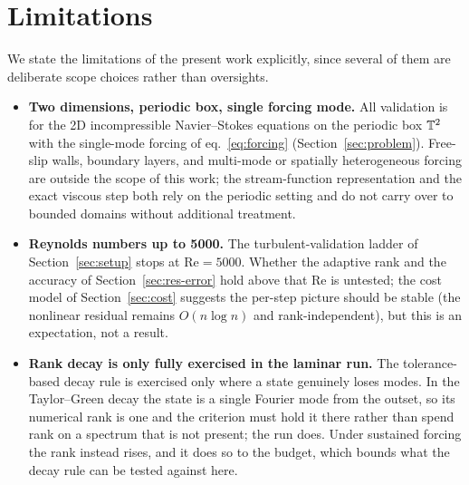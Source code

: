 
\section{Limitations}
\label{sec:limitations}

We state the limitations of the present work explicitly, since several of
them are deliberate scope choices rather than oversights.

\begin{itemize}
  \item \textbf{Two dimensions, periodic box, single forcing mode.}
  All validation is for the 2D incompressible Navier--Stokes equations on
  the periodic box $\mathbb{T}^2$ with the single-mode forcing of
  eq.~\eqref{eq:forcing} (Section~\ref{sec:problem}). Free-slip walls,
  boundary layers, and multi-mode or spatially heterogeneous forcing are
  outside the scope of this work; the stream-function representation and the
  exact viscous step both rely on the periodic setting and do not carry over
  to bounded domains without additional treatment.

  \item \textbf{Reynolds numbers up to 5000.} The turbulent-validation
  ladder of Section~\ref{sec:setup} stops at $\mathrm{Re} = 5000$. Whether
  the adaptive rank and the accuracy of Section~\ref{sec:res-error} hold
  above that Re is untested; the cost model of Section~\ref{sec:cost}
  suggests the per-step picture should be stable (the nonlinear residual
  remains $O(n \log n)$ and rank-independent), but this is an expectation,
  not a result.

  \item \textbf{Rank decay is only fully exercised in the laminar run.}
  The tolerance-based decay rule is exercised only where a state genuinely loses
  modes. In the Taylor--Green decay the state is a single Fourier mode from the
  outset, so its numerical rank is one and the criterion must hold it there
  rather than spend rank on a spectrum that is not present; the run does. Under
  sustained forcing the rank instead rises, and it does so to the budget, which bounds what the decay rule can be tested against
  here.


\end{itemize}
